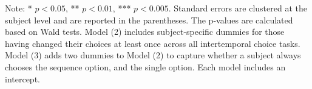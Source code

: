 \documentclass[12pt]{article}
\begin{document}
\begin{table}
    \vspace*{4pt}
    \centering
    \begin{minipage}{0.85\textwidth}
    {\par\footnotesize Note: * $p<0.05$, ** $p<0.01$, *** $p<0.005$. Standard errors are clustered at the subject level and are reported in the parentheses. The p-values are calculated based on Wald tests. Model (2) includes subject-specific dummies for those having changed their choices at least once across all intertemporal choice tasks. Model (3) adds two dummies to Model (2) to capture whether a subject always chooses the sequence option, and the single option. Each model includes an intercept. }
    \end{minipage}
    \label{tab:exp3_reg_intertemporal_choice}
\end{table}
\end{document}
